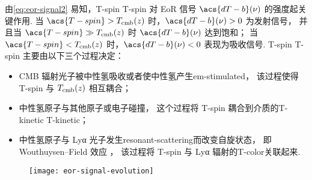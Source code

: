 由\autoref{eq:eor-signal2} 易知，\acl{T-spin} \acs{T-spin}
对 EoR 信号 $\acs{dT-b}(\nu)$ 的强度起关键作用.
当 $\acs{T-spin} > T_{\R{cmb}}(z)$ 时，$\acs{dT-b}(\nu) > 0$ 为发射信号，
并且当 $\acs{T-spin} \gg T_{\R{cmb}}(z)$ 时 $\acs{dT-b}(\nu)$ 达到饱和；
当 $\acs{T-spin} < T_{\R{cmb}}(z)$ 时，$\acs{dT-b}(\nu) < 0$ 表现为吸收信号.
\acl{T-spin} \acs{T-spin} 主要由以下三个过程决定：
\begin{itemize}
  \item CMB 辐射光子被中性氢吸收或者使中性氢产生\ac{em-stimulated}，
    该过程使得 \acs{T-spin} 与 $T_{\mathrm{cmb}}(z)$ 相互耦合；
  \item 中性氢原子与其他原子或电子碰撞，
    这个过程将 \acs{T-spin} 耦合到介质的\acl{T-kinetic} \acs{T-kinetic}；
  \item 中性氢原子与 Lyα 光子发生\ac{resonant-scattering}而改变自旋状态，
    即 Wouthuysen--Field 效应 \cite{wouthuysen1952,field1958}，
    该过程将 \acs{T-spin} 与 Lyα 辐射的\ac{T-color}关联起来.
\end{itemize}

\begin{figure}[tbp]
  \centering
  \texttt{[image: eor-signal-evolution]}
  \label{fig:eor-signal-evo}
\end{figure}

